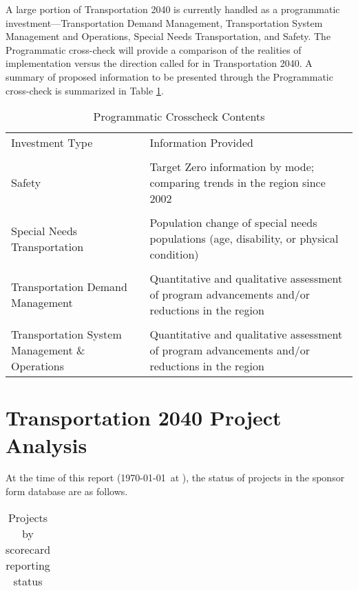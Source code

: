 \documentclass[10pt, letterpaper, final, twoside, onecolumn]{memoir}%
\begin{document}
A large portion of Transportation 2040 is currently handled as a programmatic investment—Transportation Demand Management, Transportation System Management and Operations, Special Needs Transportation, and Safety. The Programmatic cross-check will provide a comparison of the realities of implementation versus the direction called for in Transportation 2040. A summary of proposed information to be presented through the Programmatic cross-check is summarized in Table \ref{tb:crosschecks}.
\begin{table}[htdp]
\caption{Programmatic Crosscheck Contents}
\begin{center}
\begin{tabularx}{0.8\textwidth}{>{\raggedright\arraybackslash}p{10pc}>{\raggedright\arraybackslash}X}
\toprule
Investment Type	&	Information Provided \\ \\
\midrule
Safety	&	Target Zero information by mode; comparing trends in the region since 2002 \\ \\
Special Needs Transportation	&	Population change of special needs populations (age, disability, or physical condition) \\ \\
Transportation Demand Management	&	Quantitative and qualitative assessment of program advancements and/or reductions in the region \\ \\
Transportation System Management \& Operations	&	Quantitative and qualitative assessment of program advancements and/or reductions in the region \\
\bottomrule
\end{tabularx}
\end{center}
\label{tb:crosschecks}
\end{table}%




\chapter{Transportation 2040 Project Analysis}
\label{ch:analysis}
At the time of this report (\today \ at \currenttime), the status of projects in the sponsor form database are as follows.


\begin{table}[htdp]
\caption{Projects by scorecard reporting status}
\begin{center}
\begin{tabularx}{0.35\textwidth}{>{\raggedright\arraybackslash}X>{\raggedright\arraybackslash}X}
\toprule



\end{tabularx}
\end{center}
\label{tb:projects_by_status}
\end{table}%
\end{document}
